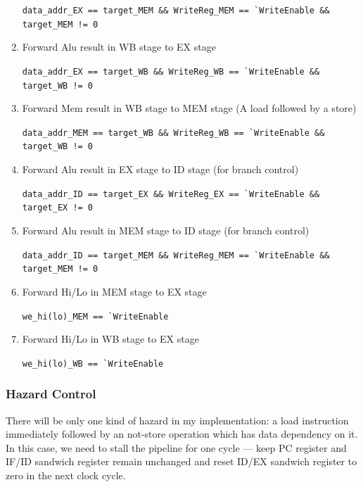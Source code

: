 \documentclass[paper=a4, fontsize=11pt]{scrartcl} %
\numberwithin{equation}{section} %
\numberwithin{figure}{section} %
\numberwithin{table}{section} %
\begin{document}
\begin{spacing}{1.5}
\begin{enumerate}
	    	 	\verb|data_addr_EX == target_MEM && WriteReg_MEM == `WriteEnable &&| \\
	    	 	\verb|target_MEM != 0|
	    	 	
	    	 	\item Forward Alu result in WB stage to EX stage
	    	 	
	    	 	\verb|data_addr_EX == target_WB && WriteReg_WB == `WriteEnable &&| \\
	    	 	\verb|target_WB != 0|
	    	 	
	    	 	\item Forward Mem result in WB stage to MEM stage (A load followed by a store)
	    	 	
	    	 	\verb|data_addr_MEM == target_WB && WriteReg_WB == `WriteEnable &&| \\
	    	 	\verb|target_WB != 0|
	    	 	
	    	 	\item Forward Alu result in EX stage to ID stage (for branch control)
	    	 	
	    	 	\verb|data_addr_ID == target_EX && WriteReg_EX == `WriteEnable &&| \\
	    	 	\verb|target_EX != 0|
	    	 	
	    	 	\item Forward Alu result in MEM stage to ID stage (for branch control)
	    	 	
	    	 	\verb|data_addr_ID == target_MEM && WriteReg_MEM == `WriteEnable &&| \\
	    	 	\verb|target_MEM != 0|
	    	 	
	    	 	\item Forward Hi/Lo in MEM stage to EX stage
	    	 	
	    	 	\verb|we_hi(lo)_MEM == `WriteEnable|
	    	 	
	    	 	\item Forward Hi/Lo in WB stage to EX stage

	    	 	\verb|we_hi(lo)_WB == `WriteEnable|
	    	 	
	    	 \end{enumerate}
    	\subsubsection{Hazard Control}
    		There will be only one kind of hazard in my implementation: a load instruction immediately followed by an not-store operation which has data dependency on it. In this case, we need to stall the pipeline for one cycle --- keep PC register and IF/ID sandwich register remain unchanged and reset ID/EX sandwich register to zero in the next clock cycle.

\end{spacing}
\end{document}
